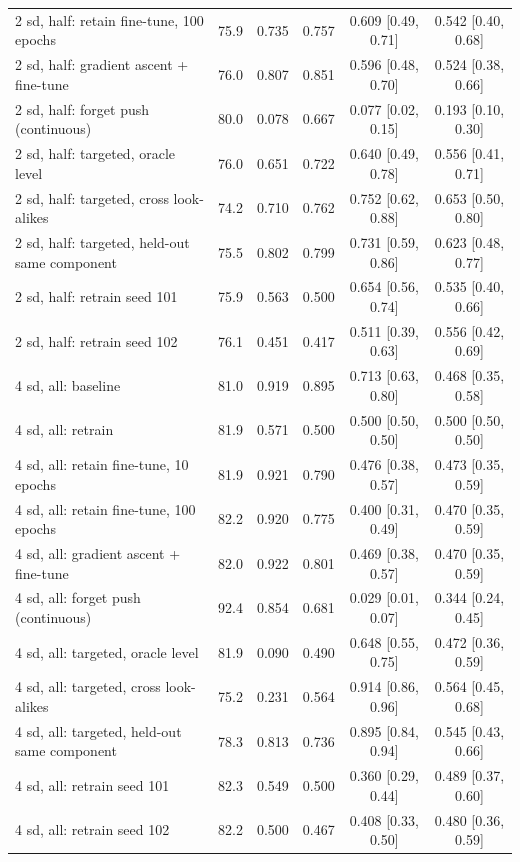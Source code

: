 \begin{tabular}{lccccc}
2 sd, half: retain fine-tune, 100 epochs & 75.9 & 0.735 & 0.757 & 0.609 [0.49, 0.71] & 0.542 [0.40, 0.68] \\
2 sd, half: gradient ascent + fine-tune & 76.0 & 0.807 & 0.851 & 0.596 [0.48, 0.70] & 0.524 [0.38, 0.66] \\
2 sd, half: forget push (continuous) & 80.0 & 0.078 & 0.667 & 0.077 [0.02, 0.15] & 0.193 [0.10, 0.30] \\
2 sd, half: targeted, oracle level & 76.0 & 0.651 & 0.722 & 0.640 [0.49, 0.78] & 0.556 [0.41, 0.71] \\
2 sd, half: targeted, cross look-alikes & 74.2 & 0.710 & 0.762 & 0.752 [0.62, 0.88] & 0.653 [0.50, 0.80] \\
2 sd, half: targeted, held-out same component & 75.5 & 0.802 & 0.799 & 0.731 [0.59, 0.86] & 0.623 [0.48, 0.77] \\
2 sd, half: retrain seed 101 & 75.9 & 0.563 & 0.500 & 0.654 [0.56, 0.74] & 0.535 [0.40, 0.66] \\
2 sd, half: retrain seed 102 & 76.1 & 0.451 & 0.417 & 0.511 [0.39, 0.63] & 0.556 [0.42, 0.69] \\
\midrule
4 sd, all: baseline & 81.0 & 0.919 & 0.895 & 0.713 [0.63, 0.80] & 0.468 [0.35, 0.58] \\
4 sd, all: retrain & 81.9 & 0.571 & 0.500 & 0.500 [0.50, 0.50] & 0.500 [0.50, 0.50] \\
4 sd, all: retain fine-tune, 10 epochs & 81.9 & 0.921 & 0.790 & 0.476 [0.38, 0.57] & 0.473 [0.35, 0.59] \\
4 sd, all: retain fine-tune, 100 epochs & 82.2 & 0.920 & 0.775 & 0.400 [0.31, 0.49] & 0.470 [0.35, 0.59] \\
4 sd, all: gradient ascent + fine-tune & 82.0 & 0.922 & 0.801 & 0.469 [0.38, 0.57] & 0.470 [0.35, 0.59] \\
4 sd, all: forget push (continuous) & 92.4 & 0.854 & 0.681 & 0.029 [0.01, 0.07] & 0.344 [0.24, 0.45] \\
4 sd, all: targeted, oracle level & 81.9 & 0.090 & 0.490 & 0.648 [0.55, 0.75] & 0.472 [0.36, 0.59] \\
4 sd, all: targeted, cross look-alikes & 75.2 & 0.231 & 0.564 & 0.914 [0.86, 0.96] & 0.564 [0.45, 0.68] \\
4 sd, all: targeted, held-out same component & 78.3 & 0.813 & 0.736 & 0.895 [0.84, 0.94] & 0.545 [0.43, 0.66] \\
4 sd, all: retrain seed 101 & 82.3 & 0.549 & 0.500 & 0.360 [0.29, 0.44] & 0.489 [0.37, 0.60] \\
4 sd, all: retrain seed 102 & 82.2 & 0.500 & 0.467 & 0.408 [0.33, 0.50] & 0.480 [0.36, 0.59] \\

\end{tabular}
